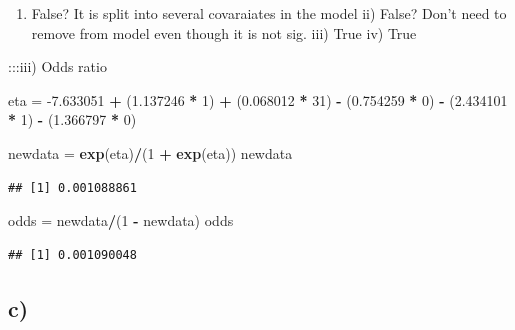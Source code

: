 \documentclass[
]{article}
\newenvironment{Shaded}{\begin{snugshade}}{\end{snugshade}}
\newcommand{\DecValTok}[1]{\textcolor[rgb]{0.00,0.00,0.81}{#1}}
\newcommand{\FloatTok}[1]{\textcolor[rgb]{0.00,0.00,0.81}{#1}}
\newcommand{\KeywordTok}[1]{\textcolor[rgb]{0.13,0.29,0.53}{\textbf{#1}}}
\newcommand{\NormalTok}[1]{#1}
\newcommand{\OperatorTok}[1]{\textcolor[rgb]{0.81,0.36,0.00}{\textbf{#1}}}
\newcommand{\StringTok}[1]{\textcolor[rgb]{0.31,0.60,0.02}{#1}}
\providecommand{\tightlist}{%
  \setlength{\itemsep}{0pt}\setlength{\parskip}{0pt}}
\begin{document}
\begin{enumerate}
\def\labelenumi{\roman{enumi})}
\tightlist
\item
  False? It is split into several covaraiates in the model ii) False?
  Don't need to remove from model even though it is not sig. iii) True
  iv) True
\end{enumerate}

:::iii) Odds ratio

\begin{Shaded}
\begin{Highlighting}[]
\NormalTok{eta =}\StringTok{ }\FloatTok{-7.633051} \OperatorTok{+}\StringTok{ }\NormalTok{(}\FloatTok{1.137246} \OperatorTok{*}\StringTok{ }\DecValTok{1}\NormalTok{) }\OperatorTok{+}\StringTok{ }\NormalTok{(}\FloatTok{0.068012} \OperatorTok{*}\StringTok{ }\DecValTok{31}\NormalTok{) }\OperatorTok{-}\StringTok{ }\NormalTok{(}\FloatTok{0.754259} \OperatorTok{*}\StringTok{ }\DecValTok{0}\NormalTok{) }\OperatorTok{-}\StringTok{ }\NormalTok{(}\FloatTok{2.434101} \OperatorTok{*}\StringTok{ }
\StringTok{    }\DecValTok{1}\NormalTok{) }\OperatorTok{-}\StringTok{ }\NormalTok{(}\FloatTok{1.366797} \OperatorTok{*}\StringTok{ }\DecValTok{0}\NormalTok{)}


\NormalTok{newdata =}\StringTok{ }\KeywordTok{exp}\NormalTok{(eta)}\OperatorTok{/}\NormalTok{(}\DecValTok{1} \OperatorTok{+}\StringTok{ }\KeywordTok{exp}\NormalTok{(eta))}
\NormalTok{newdata}
\end{Highlighting}
\end{Shaded}

\begin{verbatim}
## [1] 0.001088861
\end{verbatim}

\begin{Shaded}
\begin{Highlighting}[]
\NormalTok{odds =}\StringTok{ }\NormalTok{newdata}\OperatorTok{/}\NormalTok{(}\DecValTok{1} \OperatorTok{-}\StringTok{ }\NormalTok{newdata)}
\NormalTok{odds}
\end{Highlighting}
\end{Shaded}

\begin{verbatim}
## [1] 0.001090048
\end{verbatim}

\hypertarget{c}{%
\subsection{c)}\label{c}}
\end{document}
